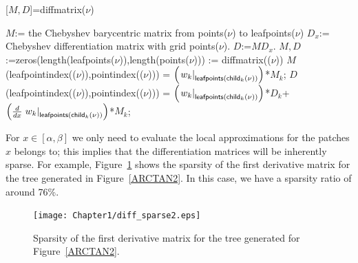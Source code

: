 \begin{algorithm}
\caption{[$M,D$]=diffmatrix($\nu$)}
\label{alg4}
\begin{algorithmic}
\STATE $M$:= the Chebyshev barycentric matrix from \textsf{points}($\nu$) to \textsf{\textsf{leafpoints}}($\nu$)
\STATE $D_x$:= Chebyshev differentiation matrix with grid \textsf{points}($\nu$).
\STATE $D$:=$M D_x$.
\ELSE
\STATE $M,D$:=zeros(length(\textsf{leafpoints}($\nu$)),length(\textsf{points}($\nu$)))
\STATE [$M_k$,$D_k$]:= diffmatrix(($\nu$))
\STATE $M$(\textsf{leafpointindex}(($\nu$)),\textsf{pointindex}(($\nu$))) = \WRP {} $\left( \left . w_k \right |_{\text{\textsf{leafpoints}(\textsf{child}$_{k}$($\nu$))}} \right)$*$M_k$;
\STATE $D$(\textsf{leafpointindex}(($\nu$)),\textsf{pointindex}(($\nu$))) = \WRP {} $\left( \left . w_k \right |_{\text{\textsf{leafpoints}(\textsf{child}$_{k}$($\nu$))}}  \right)$*$D_k$+ \WRP {} $\left( \frac{d}{dx} \left . w_k \right |_{\text{\textsf{leafpoints}(\textsf{child}$_{k}$($\nu$))}} \right)$*$M_k$;
\ENDFOR
\ENDIF
\end{algorithmic}
\end{algorithm}

For $x \in [\alpha,\beta]$ we only need to evaluate the local approximations for the patches $x$ belongs to; this implies that the differentiation matrices will be inherently sparse. For example, Figure~\ref{SPARSE_DX} shows the sparsity of the first derivative matrix for the tree generated in Figure~\ref{ARCTAN2}. In this case, we have a sparsity ratio of around 76\%.

\begin{figure}[!htb]
\centering
\texttt{[image: Chapter1/diff\_sparse2.eps]}
\caption{Sparsity of the first derivative matrix for the tree generated for Figure~\ref{ARCTAN2}.}
\label{SPARSE_DX}
\end{figure}

